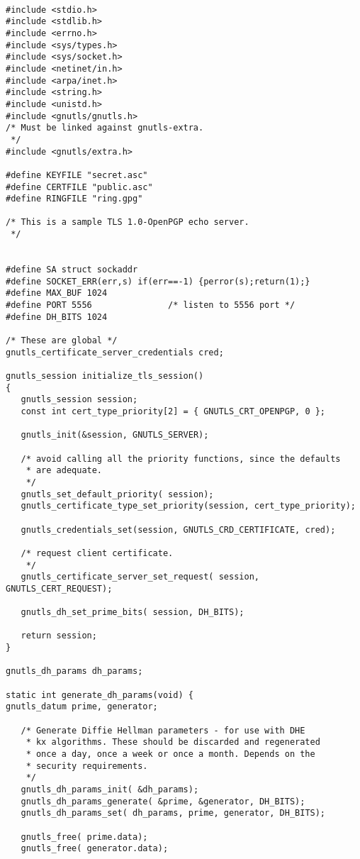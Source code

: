 \begin{verbatim}

#include <stdio.h>
#include <stdlib.h>
#include <errno.h>
#include <sys/types.h>
#include <sys/socket.h>
#include <netinet/in.h>
#include <arpa/inet.h>
#include <string.h>
#include <unistd.h>
#include <gnutls/gnutls.h>
/* Must be linked against gnutls-extra.
 */
#include <gnutls/extra.h>

#define KEYFILE "secret.asc"
#define CERTFILE "public.asc"
#define RINGFILE "ring.gpg"

/* This is a sample TLS 1.0-OpenPGP echo server.
 */


#define SA struct sockaddr
#define SOCKET_ERR(err,s) if(err==-1) {perror(s);return(1);}
#define MAX_BUF 1024
#define PORT 5556               /* listen to 5556 port */
#define DH_BITS 1024

/* These are global */
gnutls_certificate_server_credentials cred;

gnutls_session initialize_tls_session()
{
   gnutls_session session;
   const int cert_type_priority[2] = { GNUTLS_CRT_OPENPGP, 0 };

   gnutls_init(&session, GNUTLS_SERVER);

   /* avoid calling all the priority functions, since the defaults
    * are adequate.
    */
   gnutls_set_default_priority( session);
   gnutls_certificate_type_set_priority(session, cert_type_priority);

   gnutls_credentials_set(session, GNUTLS_CRD_CERTIFICATE, cred);

   /* request client certificate.
    */
   gnutls_certificate_server_set_request( session, GNUTLS_CERT_REQUEST);

   gnutls_dh_set_prime_bits( session, DH_BITS);

   return session;
}

gnutls_dh_params dh_params;

static int generate_dh_params(void) {
gnutls_datum prime, generator;

   /* Generate Diffie Hellman parameters - for use with DHE
    * kx algorithms. These should be discarded and regenerated
    * once a day, once a week or once a month. Depends on the
    * security requirements.
    */
   gnutls_dh_params_init( &dh_params);
   gnutls_dh_params_generate( &prime, &generator, DH_BITS);
   gnutls_dh_params_set( dh_params, prime, generator, DH_BITS);

   gnutls_free( prime.data);
   gnutls_free( generator.data);
   

\end{verbatim}
